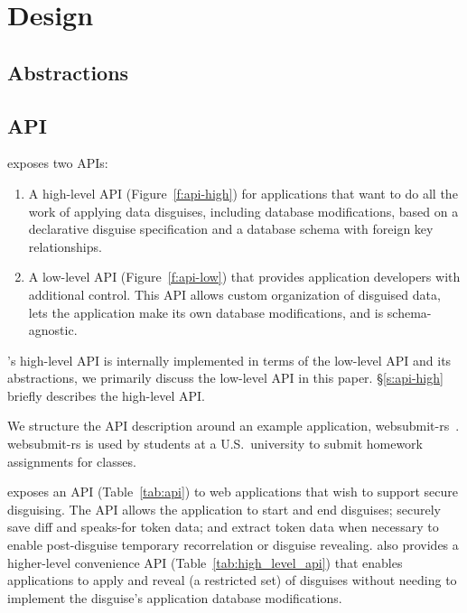 \section{Design}
\label{s:design}

\subsection{Abstractions}

\subsection{API}
\label{s:api}



\sys exposes two APIs:
\begin{enumerate}[nosep]
 \item A high-level API (Figure~\ref{f:api-high}) for applications that want \sys to do
   all the work of applying data disguises, including database modifications, based on
   a declarative disguise specification and a database schema with foreign key
   relationships.
 \item A low-level API (Figure~\ref{f:api-low}) that provides application developers with
   additional control. This API allows custom organization of disguised data, lets the
   application make its own database modifications, and is schema-agnostic.
\end{enumerate}
%
\sys's high-level API is internally implemented in terms of the low-level API and its
abstractions, we primarily discuss the low-level API in this paper.
%
\S\ref{s:api-high} briefly describes the high-level API.
%


%
We structure the API description around an example application, websubmit-rs~\cite{websubmit-rs}.
%
websubmit-rs is used by students at a U.S.\ university to submit homework assignments for classes.
%


\sys exposes an API (Table~\ref{tab:api}) to web applications that wish to support secure
disguising.
%
The API allows the application to start and end disguises; securely save diff and speaks-for token
data; and extract token data when necessary to enable post-disguise temporary recorrelation or
disguise revealing.
%
\sys also provides a higher-level convenience API (Table~\ref{tab:high_level_api}) that enables
applications to apply and reveal (a restricted set) of disguises without needing to implement the
disguise's application database modifications.


